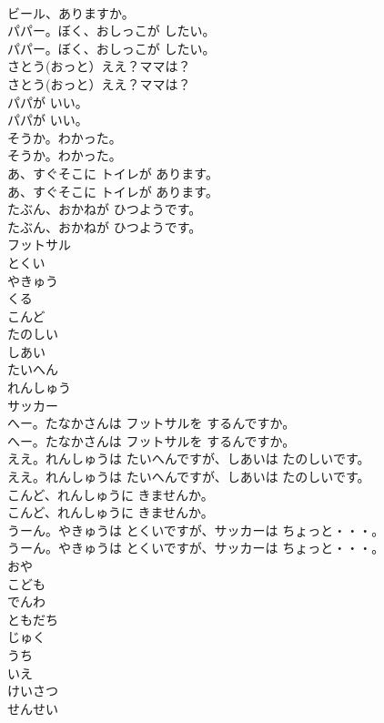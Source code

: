 \documentclass[8pt]{extreport}
\begin{document}
\begin{CJK}{UTF8}{min}
\\	ビール、ありますか。
\\	パパー。ぼく、おしっこが したい。
\\	パパー。ぼく、おしっこが したい。
\\	さとう(おっと）ええ？ママは？
\\	さとう(おっと）ええ？ママは？
\\	パパが いい。
\\	パパが いい。
\\	そうか。わかった。
\\	そうか。わかった。
\\	あ、すぐそこに トイレが あります。
\\	あ、すぐそこに トイレが あります。
\\	たぶん、おかねが ひつようです。
\\	たぶん、おかねが ひつようです。
\\	フットサル
\\	とくい
\\	やきゅう
\\	くる
\\	こんど
\\	たのしい
\\	しあい
\\	たいへん
\\	れんしゅう
\\	サッカー
\\	へー。たなかさんは フットサルを するんですか。
\\	へー。たなかさんは フットサルを するんですか。
\\	ええ。れんしゅうは たいへんですが、しあいは たのしいです。
\\	ええ。れんしゅうは たいへんですが、しあいは たのしいです。
\\	こんど、れんしゅうに きませんか。
\\	こんど、れんしゅうに きませんか。
\\	うーん。やきゅうは とくいですが、サッカーは ちょっと・・・。
\\	うーん。やきゅうは とくいですが、サッカーは ちょっと・・・。
\\	おや
\\	こども
\\	でんわ
\\	ともだち
\\	じゅく
\\	うち 
\\	いえ
\\	けいさつ
\\	せんせい

\end{CJK}
\end{document}
